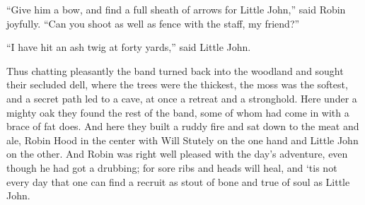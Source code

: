 ``Give him a bow, and find a full sheath of arrows for Little John,''
said Robin joyfully. ``Can you shoot as well as fence with the staff, my
friend?''

``I have hit an ash twig at forty yards,'' said Little John.

Thus chatting pleasantly the band turned back into the woodland and
sought their secluded dell, where the trees were the thickest, the moss
was the softest, and a secret path led to a cave, at once a retreat and
a stronghold. Here under a mighty oak they found the rest of the band,
some of whom had come in with a brace of fat does. And here they built a
ruddy fire and sat down to the meat and ale, Robin Hood in the center
with Will Stutely on the one hand and Little John on the other. And
Robin was right well pleased with the day's adventure, even though he
had got a drubbing; for sore ribs and heads will heal, and `tis not
every day that one can find a recruit as stout of bone and true of soul
as Little John.
